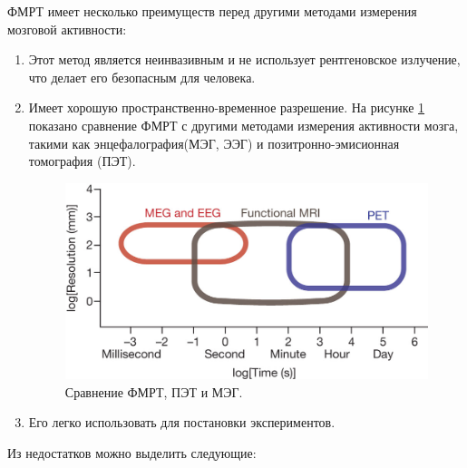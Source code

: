 \documentclass[pdftex,ptm,12pt,a4paper]{report}
\theoremstyle{definition}
\begin{document}
ФМРТ имеет несколько преимуществ перед другими методами измерения мозговой активности:
\begin{enumerate}
\item Этот метод является неинвазивным и не использует рентгеновское излучение, что делает его безопасным для человека.

\item Имеет хорошую пространственно-временное разрешение. На рисунке \ref{fmri} показано сравнение ФМРТ с другими методами измерения активности мозга, такими как энцефалография(МЭГ, ЭЭГ) и позитронно-эмисионная томография (ПЭТ).

\begin{figure}[h]
\includegraphics[scale=0.3]{images/fmrt.jpg}
\centering
\caption{Сравнение ФМРТ, ПЭТ и МЭГ.}
\label{fmri}
\end{figure}

\item Его легко использовать для постановки экспериментов.
\end{enumerate}

Из недостатков можно выделить следующие:
\end{document}
